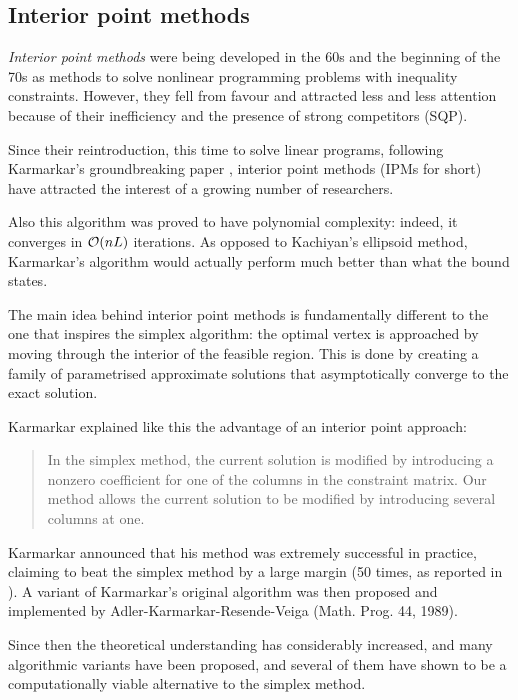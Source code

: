 %
%
\subsection{Interior point methods}

{\em Interior point methods} were being developed in the 60s and the 
beginning of the 70s as methods to solve nonlinear programming problems 
with inequality constraints. 
However, they fell from favour and attracted less and less attention
because of their inefficiency and the presence of strong competitors
(SQP).

Since their reintroduction, this time to solve linear programs, 
following Karmarkar's groundbreaking paper
\cite{Karmarkar}, interior point methods (IPMs for short) have attracted 
the interest of a growing number of researchers.

Also this algorithm was proved to have polynomial complexity: 
indeed, it converges in $\mathcal{O}(nL)$ iterations. As opposed to
Kachiyan's ellipsoid method, Karmarkar's algorithm would actually
perform much better than what the bound states.

The main idea behind interior point methods is fundamentally different 
to the one that inspires the simplex algorithm: the optimal vertex 
is approached by moving through the interior of the feasible region.
This is done by creating a family of parametrised approximate solutions
that asymptotically converge to the exact solution.

Karmarkar \cite{Karmarkar} explained like this the advantage of an
interior point approach:
\begin{quote}
In the simplex method, the current solution is modified by introducing
a nonzero coefficient for one of the columns in the constraint
matrix. Our method allows the current solution to be modified by
introducing several columns at one.
\end{quote}


Karmarkar announced that his method was extremely successful in practice, 
claiming to beat the simplex method by a large margin (50 times,
as reported in \cite{MWright92}).
A variant of Karmarkar's original algorithm was then proposed and 
implemented by Adler-Karmarkar-Resende-Veiga 
(Math. Prog. 44, 1989).

Since then the theoretical understanding has considerably increased,
and many algorithmic variants have been proposed, and several of
them have shown to be a computationally viable alternative to the
simplex method.

